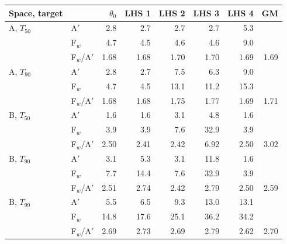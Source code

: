 \begin{tabular}{llrrrrrr}\toprule
Space, target & & $\theta_0$ & LHS 1 & LHS 2 & LHS 3 & LHS 4 & GM\\\midrule
A, $T_{50}$ & A$'$ & 2.8 & 2.7 & 2.7 & 2.7 & 5.3 & \\
 & F$_w$ & 4.7 & 4.5 & 4.6 & 4.6 & 9.0 & \\
 & F$_w$/A$'$ & 1.68 & 1.68 & 1.70 & 1.70 & 1.69 & 1.69\\
\addlinespace
A, $T_{90}$ & A$'$ & 2.8 & 2.7 & 7.5 & 6.3 & 9.0 & \\
 & F$_w$ & 4.7 & 4.5 & 13.1 & 11.2 & 15.3 & \\
 & F$_w$/A$'$ & 1.68 & 1.68 & 1.75 & 1.77 & 1.69 & 1.71\\
\addlinespace
B, $T_{50}$ & A$'$ & 1.6 & 1.6 & 3.1 & 4.8 & 1.6 & \\
 & F$_w$ & 3.9 & 3.9 & 7.6 & 32.9 & 3.9 & \\
 & F$_w$/A$'$ & 2.50 & 2.41 & 2.42 & 6.92 & 2.50 & 3.02\\
\addlinespace
B, $T_{90}$ & A$'$ & 3.1 & 5.3 & 3.1 & 11.8 & 1.6 & \\
 & F$_w$ & 7.7 & 14.4 & 7.6 & 32.9 & 3.9 & \\
 & F$_w$/A$'$ & 2.51 & 2.74 & 2.42 & 2.79 & 2.50 & 2.59\\
\addlinespace
B, $T_{99}$ & A$'$ & 5.5 & 6.5 & 9.3 & 13.0 & 13.1 & \\
 & F$_w$ & 14.8 & 17.6 & 25.1 & 36.2 & 34.2 & \\
 & F$_w$/A$'$ & 2.69 & 2.73 & 2.69 & 2.79 & 2.62 & 2.70\\
\bottomrule\end{tabular}
